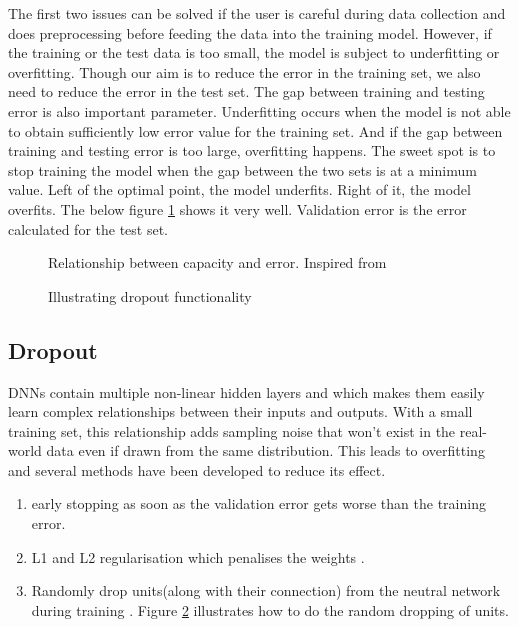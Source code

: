 The first two issues can be solved if the user is careful during data collection and does
preprocessing before feeding the data into the training model. However, if the training or
the test data is too small, the model is subject to underfitting or overfitting. Though
our aim is to reduce the error in the training set, we also need to reduce the error in
the test set. The gap between training and testing error is also important parameter.
Underfitting occurs when the model is not able to obtain sufficiently low error value for
the training set. And if the gap between training and testing error is too large,
overfitting happens. The sweet spot is to stop training the model when the gap between the
two sets is at a minimum value. \label{inside:formodelcheckpoint} Left of the optimal point, the model underfits. Right of
it, the model overfits. The below figure \ref{fig:overfittingunderfitting} shows it very
well. Validation error is the error calculated for the test set.
\begin{figure}[h]
	\centering
    \def\svgwidth{0.75\textwidth}
    \caption{Relationship between capacity and error. Inspired from
    \cite{Goodfellow-et-al-2016}}
    \label{fig:overfittingunderfitting}
\end{figure}


\begin{figure}[h]
	\centering
    \def\svgwidth{0.5\textwidth}
    
    \caption{Illustrating dropout functionality}
    \label{fig:Dropout_function}
\end{figure}

\subsection{Dropout}
DNNs contain multiple non-linear hidden layers and which makes them easily learn
complex relationships between their inputs and outputs. With a small training set, this
relationship adds sampling noise that won't exist in the real-world data even if drawn
from the same distribution. This leads to overfitting and several methods have been
developed to reduce its effect.
\begin{enumerate}
    \item early stopping as soon as the validation error gets worse than the training
        error. \label{item:earlystopping}
    \item L1 and L2 regularisation which penalises the weights \cite{Schmidhuber_2015}.
    \item Randomly drop units(along with their connection) from the neutral network during
        training \cite{dropoutpaper}. Figure \ref{fig:Dropout_function} illustrates how to
        do the random dropping of units.
    \end{enumerate}


